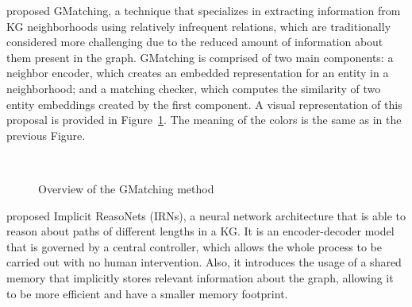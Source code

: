 \citet{xiong2018} proposed GMatching, a technique that specializes in extracting information from KG neighborhoods using relatively infrequent relations, which are traditionally considered more challenging due to the reduced amount of information about them present in the graph. GMatching is comprised of two main components: a neighbor encoder, which creates an embedded representation for an entity in a neighborhood; and a matching checker, which computes the similarity of two entity embeddings created by the first component. A visual representation of this proposal is provided in Figure~\ref{fig:path-gmatching}. The meaning of the colors is the same as in the previous Figure.

\begin{figure}[!htp]
    \centering
    
    \\

    \caption{Overview of the GMatching method}
    \label{fig:path-gmatching}
\end{figure}

\citet{shen2017} proposed Implicit ReasoNets (IRNs), a neural network architecture that is able to reason about paths of different lengths in a KG. It is an encoder-decoder model that is governed by a central controller, which allows the whole process to be carried out with no human intervention. Also, it introduces the usage of a shared memory that implicitly stores relevant information about the graph, allowing it to be more efficient and have a smaller memory footprint.

